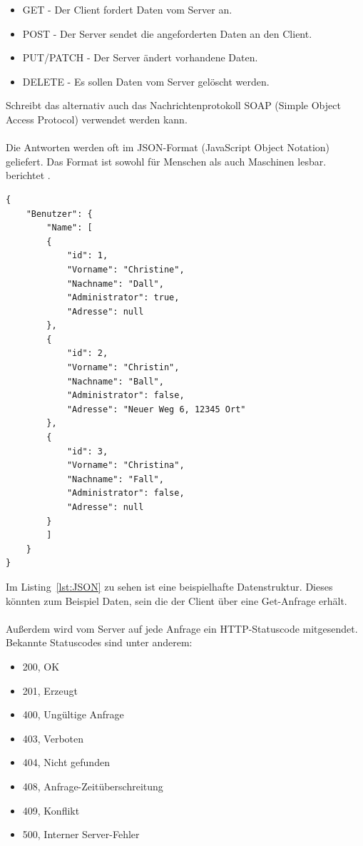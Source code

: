 \begin{itemize}
	\itemsep0pt
	\item GET - Der Client fordert Daten vom Server an.
	\item POST - Der Server sendet die angeforderten Daten an den Client.
	\item PUT/PATCH - Der Server ändert vorhandene Daten.
	\item DELETE - Es sollen Daten vom Server gelöscht werden.
\end{itemize}

Schreibt das \cite{horn} alternativ auch das Nachrichtenprotokoll SOAP (Simple Object Access Protocol) verwendet werden kann.
\\
\\
\glqq Die Antworten werden oft im JSON-Format (JavaScript Object Notation) geliefert. Das Format ist sowohl für Menschen als auch Maschinen lesbar.\grqq{} berichtet \cite{RESTAPI3}.
\\
\lstset{language=java}
\begin{lstlisting}[frame=htrbl, caption={Beispiel für Daten im JSON Format}, label={lst:JSON}]
{
	"Benutzer": {
		"Name": [
		{
			"id": 1,
			"Vorname": "Christine",
			"Nachname": "Dall",
			"Administrator": true,
			"Adresse": null
		},
		{
			"id": 2,
			"Vorname": "Christin",
			"Nachname": "Ball",
			"Administrator": false,
			"Adresse": "Neuer Weg 6, 12345 Ort"
		},
		{
			"id": 3,
			"Vorname": "Christina",
			"Nachname": "Fall",
			"Administrator": false,
			"Adresse": null
		}
		]
	}
}
\end{lstlisting}

Im Listing~\ref{lst:JSON} zu sehen ist eine beispielhafte Datenstruktur. Dieses könnten zum Beispiel Daten, sein die der Client über eine Get-Anfrage erhält.
\\
\\
Außerdem wird vom Server auf jede Anfrage ein HTTP-Statuscode mitgesendet. Bekannte Statuscodes sind unter anderem: \cite{Statuscodes}
\begin{itemize}
	\itemsep0pt
	\item 200, OK
	\item 201, Erzeugt
	\item 400, Ungültige Anfrage
	\item 403, Verboten
	\item 404, Nicht gefunden
	\item 408, Anfrage-Zeitüberschreitung
	\item 409, Konflikt
	\item 500, Interner Server-Fehler
\end{itemize}

